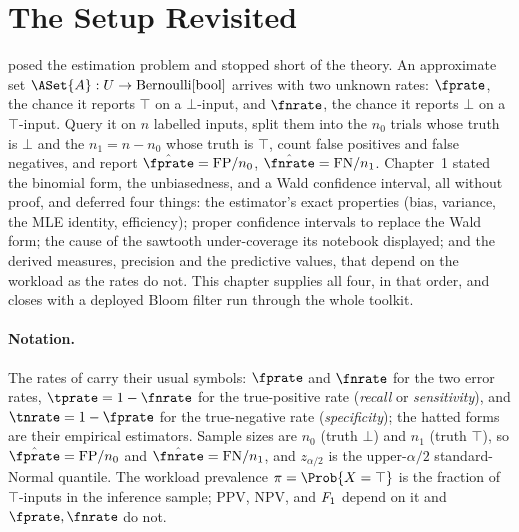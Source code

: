 %

\section{The Setup Revisited}
\label{sec:setup-revisited}

 posed the estimation problem and stopped short of
the theory. An approximate set $\ASet{A} : \Universe \to \Bernoulli{\BoolType}$
arrives with two unknown rates: $\fprate$, the chance it reports $\top$ on a
$\bot$-input, and $\fnrate$, the chance it reports $\bot$ on a $\top$-input.
Query it on $n$ labelled inputs, split them into the $n_0$ trials whose truth
is $\bot$ and the $n_1 = n - n_0$ whose truth is $\top$, count false positives
and false negatives, and report $\hat{\fprate} = \mathrm{FP}/n_0$,
$\hat{\fnrate} = \mathrm{FN}/n_1$. Chapter~1 stated the binomial form, the
unbiasedness, and a Wald confidence interval, all without proof, and deferred
four things: the estimator's exact properties (bias, variance, the MLE
identity, efficiency); proper confidence intervals to replace the Wald form;
the cause of the sawtooth under-coverage its notebook displayed; and the
derived measures, precision and the predictive values, that depend on the
workload as the rates do not. This chapter supplies all four, in that order,
and closes with a deployed Bloom filter run through the whole toolkit.

\paragraph{Notation.}
The rates of  carry their usual symbols:
$\fprate$ and $\fnrate$ for the two error rates, $\tprate = 1 - \fnrate$ for
the true-positive rate (\emph{recall} or
\emph{sensitivity}), and $\tnrate = 1 - \fprate$ for the true-negative
rate (\emph{specificity}); the
hatted forms are their empirical estimators. Sample sizes are $n_0$ (truth
$\bot$) and $n_1$ (truth $\top$), so $\hat{\fprate} = \mathrm{FP}/n_0$ and
$\hat{\fnrate} = \mathrm{FN}/n_1$, and $z_{\alpha/2}$ is the upper-$\alpha/2$
standard-Normal quantile. The workload prevalence $\pi = \Prob{X = \top}$ is
the fraction of $\top$-inputs in the inference sample; PPV, NPV, and $F_1$
depend on it and $\fprate, \fnrate$ do not.
